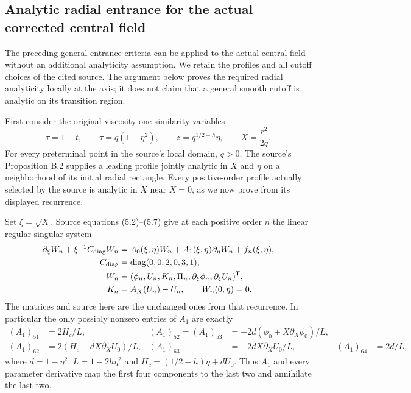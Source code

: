 \subsection{Analytic radial entrance for the actual corrected central field}
\label{sec:cq-actual-angular-analytic}

The preceding general entrance criteria can be applied to the actual
central field without an additional analyticity assumption. We retain
the profiles and all cutoff choices of the cited source. The argument
below proves the required radial analyticity locally at the axis; it
does not claim that a general smooth cutoff is analytic on its
transition region.

First consider the original viscosity-one similarity variables
\[
 \tau=1-t,\qquad \tau=q(1-\eta^2),\qquad
 z=q^{1/2-h}\eta,\qquad X=\frac{r^2}{2q}.
\]
For every preterminal point in the source's local domain, $q>0$.
The source's Proposition B.2 supplies a leading profile jointly
analytic in $X$ and $\eta$ on a neighborhood of its initial radial
rectangle. Every positive-order profile actually selected by the
source is analytic in $X$ near $X=0$, as we now prove from its
displayed recurrence.

Set $\xi=\sqrt X$. Source equations (5.2)--(5.7) give at each
positive order $n$ the linear regular-singular system
\begin{equation}
\begin{split}
 \partial_\xi W_n+\xi^{-1}C_{\rm diag}W_n
       &=A_0(\xi,\eta)W_n+
             A_1(\xi,\eta)\partial_\eta W_n+f_n(\xi,\eta),\\
 C_{\rm diag}&=\operatorname{diag}(0,0,2,0,3,1),\\
 W_n&=(\phi_n,U_n,K_n,\Pi_n,\partial_\xi\phi_n,
                                      \partial_\xi U_n)^{\mathsf T},\\
 K_n&=A_X(U_n)-U_n,\qquad W_n(0,\eta)=0 .
\end{split}
 \label{eq:cq-actual-axis-linear-system}
\end{equation}
The matrices and source here are the unchanged ones from that
recurrence. In particular the only possibly nonzero entries of
$A_1$ are exactly
\begin{align*}
 (A_1)_{51}&=2H_c/L,&
 (A_1)_{52}=(A_1)_{53}
     &=-2d(\phi_0+X\partial_X\phi_0)/L,\\
 (A_1)_{62}&=2(H_c-dX\partial_XU_0)/L,&
 (A_1)_{63}&=-2dX\partial_XU_0/L,&
 (A_1)_{64}&=2d/L,
\end{align*}
where $d=1-\eta^2$, $L=1-2h\eta^2$ and
$H_c=(1/2-h)\eta+dU_0$. Thus $A_1$ and every parameter derivative
map the first four components to the last two and annihilate
the last two.

